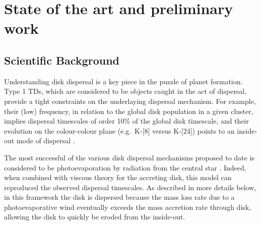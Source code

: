 \documentclass[10pt,fleqn,twoside]{article}
\begin{document}
\section{State of the art and preliminary work}
\renewcommand{\leftmark}{\sc State of the Art and preliminary work}

\subsection{Scientific Background}

Understanding disk dispersal is a key piece in the puzzle of planet
formation. Type 1 TDs, which are considered to be objects caught in
the act of dispersal, provide a tight constraints on the underlaying
dispersal mechanism. For example, their (low) frequency, in relation
to the global disk population in a given cluster, implies dispersal
timescales of order 10\% of the global disk timescale, and their
evolution on the colour-colour plane (e.g.\ K-[8] versus K-[24]) points
to an inside-out mode of 
dispersal \citep[e.g.,][]{2011MNRAS.410..671E, 2013MNRAS.428.3327K,
2015MNRAS.452.3689E}.

The most successful of the various disk dispersal mechanisms
proposed to date is considered to be photoevaporation by radiation
from the central star
\citep[e.g.,][]{2001MNRAS.328..485C}. Indeed, when combined with
viscous theory for the accreting disk, this model can
reproduced the observed dispersal timescales. 
As described in more details below, in this
framework the disk is dispersed because
the mass loss rate due to a photoevaporative wind eventually exceeds the mass accretion
rate through disk, allowing the disk to quickly be eroded from the inside-out.
\end{document}
